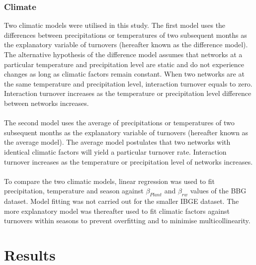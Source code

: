 \documentclass[11pt]{article}
\begin{document}
\subsubsection{Climate}
Two climatic models were utilised in this study. The first model uses the differences between precipitations or temperatures of two subsequent months as the explanatory variable of turnovers (hereafter known as the difference model). The alternative hypothesis of the difference model assumes that networks at a particular temperature and precipitation level are static and do not experience changes as long as climatic factors remain constant. When two networks are at the same temperature and precipitation level, interaction turnover equals to zero. Interaction turnover increases as the temperature or precipitation level difference between networks increases.\\
\\
The second model uses the average of precipitations or temperatures of two subsequent months as the explanatory variable of turnovers (hereafter known as the average model). The average model postulates that two networks with identical climatic factors will yield a particular turnover rate. Interaction turnover increases as the temperature or precipitation level of networks increases.\\
\\
To compare the two climatic models, linear regression was used to fit precipitation, temperature and season against $\beta_{Plant}$ and $\beta_{rw}$ values of the BBG dataset. Model fitting was not carried out for the smaller IBGE dataset. The more explanatory model was thereafter used to fit climatic factors against turnovers within seasons to prevent overfitting and to minimise multicollinearity.

\newpage
\section{Results} %
\end{document}
